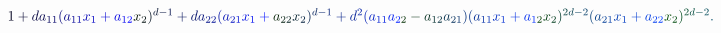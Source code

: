 \documentclass[12pt]{article}
\begin{document}
\makeatletter
\renewcommand*{\@textcolor}[3]{%
  \protect\leavevmode
  \begingroup
    \color#1{#2}#3%
  \endgroup
}
\makeatother
\begin{displaymath}
\begin{array} {cc} \mathcolor[RGB]{0,0,15}{\textstyle} { \mathcolor[RGB]{0,0,30}{1} \mathcolor[RGB]{0,0,45}{+} \mathcolor[RGB]{0,0,60}{d} \mathcolor[RGB]{0,0,75}{a} _ { \mathcolor[RGB]{0,0,90}{1} \mathcolor[RGB]{0,0,105}{1} } \mathcolor[RGB]{0,0,120}{(} \mathcolor[RGB]{0,0,135}{a} _ { \mathcolor[RGB]{0,0,150}{1} \mathcolor[RGB]{0,0,165}{1} } \mathcolor[RGB]{0,0,180}{x} _ { \mathcolor[RGB]{0,0,195}{1} } \mathcolor[RGB]{0,0,210}{+} \mathcolor[RGB]{0,0,225}{a} _ { \mathcolor[RGB]{0,0,240}{1} \mathcolor[RGB]{0,0,255}{2} } \mathcolor[RGB]{0,15,0}{x} _ { \mathcolor[RGB]{0,15,15}{2} } \mathcolor[RGB]{0,15,30}{)} ^ { \mathcolor[RGB]{0,15,45}{d} \mathcolor[RGB]{0,15,60}{-} \mathcolor[RGB]{0,15,75}{1} } \mathcolor[RGB]{0,15,90}{+} \mathcolor[RGB]{0,15,105}{d} \mathcolor[RGB]{0,15,120}{a} _ { \mathcolor[RGB]{0,15,135}{2} \mathcolor[RGB]{0,15,150}{2} } \mathcolor[RGB]{0,15,165}{(} \mathcolor[RGB]{0,15,180}{a} _ { \mathcolor[RGB]{0,15,195}{2} \mathcolor[RGB]{0,15,210}{1} } \mathcolor[RGB]{0,15,225}{x} _ { \mathcolor[RGB]{0,15,240}{1} } \mathcolor[RGB]{0,15,255}{+} \mathcolor[RGB]{0,30,0}{a} _ { \mathcolor[RGB]{0,30,15}{2} \mathcolor[RGB]{0,30,30}{2} } \mathcolor[RGB]{0,30,45}{x} _ { \mathcolor[RGB]{0,30,60}{2} } \mathcolor[RGB]{0,30,75}{)} ^ { \mathcolor[RGB]{0,30,90}{d} \mathcolor[RGB]{0,30,105}{-} \mathcolor[RGB]{0,30,120}{1} } \mathcolor[RGB]{0,30,135}{+} \mathcolor[RGB]{0,30,150}{d} ^ { \mathcolor[RGB]{0,30,165}{2} } \mathcolor[RGB]{0,30,180}{(} \mathcolor[RGB]{0,30,195}{a} _ { \mathcolor[RGB]{0,30,210}{1} \mathcolor[RGB]{0,30,225}{1} } \mathcolor[RGB]{0,30,240}{a} _ { \mathcolor[RGB]{0,30,255}{2} \mathcolor[RGB]{0,45,0}{2} } \mathcolor[RGB]{0,45,15}{-} \mathcolor[RGB]{0,45,30}{a} _ { \mathcolor[RGB]{0,45,45}{1} \mathcolor[RGB]{0,45,60}{2} } \mathcolor[RGB]{0,45,75}{a} _ { \mathcolor[RGB]{0,45,90}{2} \mathcolor[RGB]{0,45,105}{1} } \mathcolor[RGB]{0,45,120}{)} \mathcolor[RGB]{0,45,135}{(} \mathcolor[RGB]{0,45,150}{a} _ { \mathcolor[RGB]{0,45,165}{1} \mathcolor[RGB]{0,45,180}{1} } \mathcolor[RGB]{0,45,195}{x} _ { \mathcolor[RGB]{0,45,210}{1} } \mathcolor[RGB]{0,45,225}{+} \mathcolor[RGB]{0,45,240}{a} _ { \mathcolor[RGB]{0,45,255}{1} \mathcolor[RGB]{0,60,0}{2} } \mathcolor[RGB]{0,60,15}{x} _ { \mathcolor[RGB]{0,60,30}{2} } \mathcolor[RGB]{0,60,45}{)} ^ { \mathcolor[RGB]{0,60,60}{2} \mathcolor[RGB]{0,60,75}{d} \mathcolor[RGB]{0,60,90}{-} \mathcolor[RGB]{0,60,105}{2} } \mathcolor[RGB]{0,60,120}{(} \mathcolor[RGB]{0,60,135}{a} _ { \mathcolor[RGB]{0,60,150}{2} \mathcolor[RGB]{0,60,165}{1} } \mathcolor[RGB]{0,60,180}{x} _ { \mathcolor[RGB]{0,60,195}{1} } \mathcolor[RGB]{0,60,210}{+} \mathcolor[RGB]{0,60,225}{a} _ { \mathcolor[RGB]{0,60,240}{2} \mathcolor[RGB]{0,60,255}{2} } \mathcolor[RGB]{0,75,0}{x} _ { \mathcolor[RGB]{0,75,15}{2} } \mathcolor[RGB]{0,75,30}{)} ^ { \mathcolor[RGB]{0,75,45}{2} \mathcolor[RGB]{0,75,60}{d} \mathcolor[RGB]{0,75,75}{-} \mathcolor[RGB]{0,75,90}{2} } \mathcolor[RGB]{0,75,105}{.} } \end{array}
\end{displaymath}
\end{document}
